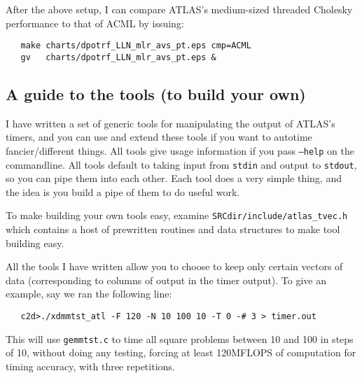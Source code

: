 \documentclass[11pt]{article}
\begin{document}
After the above setup, I can compare ATLAS's medium-sized threaded
Cholesky performance to that of ACML by issuing:
\begin{verbatim}
   make charts/dpotrf_LLN_mlr_avs_pt.eps cmp=ACML
   gv   charts/dpotrf_LLN_mlr_avs_pt.eps &
\end{verbatim}

\subsection{A guide to the tools (to build your own)}
I have written a set of generic tools for manipulating the output of
ATLAS's timers, and you can use and extend these tools if you want to
autotime fancier/different things.  All tools give usage information
if you pass {\tt --help} on the commandline.  All tools default to
taking input from {\tt stdin} and output to {\tt stdout}, so you can
pipe them into each other.  Each tool does a very simple thing, and
the idea is you build a pipe of them to do useful work.

To make building your own tools easy, examine 
{\tt SRCdir/include/atlas\_tvec.h}
which contains a host of prewritten routines and data structures to 
make tool building easy.

All the tools I have written allow you to choose to keep only certain
vectors of data (corresponding to columns of output in the timer output).
To give an example, say we ran the following line:
\begin{verbatim}
   c2d>./xdmmtst_atl -F 120 -N 10 100 10 -T 0 -# 3 > timer.out
\end{verbatim}

This will use {\tt gemmtst.c} to time all square problems between 10 and
100 in steps of 10, without doing any testing, forcing at least 120MFLOPS
of computation for timing accuracy, with three repetitions.
\end{document}
